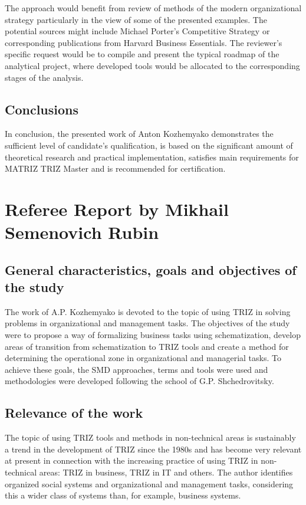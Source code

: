 \documentclass[11pt,a4paper]{article}
\begin{document}
The approach would benefit from review of methods of the modern organizational
strategy particularly in the view of some of the presented examples. The
potential sources might include Michael Porter’s Competitive Strategy or
corresponding publications from Harvard Business Essentials. The reviewer’s
specific request would be to compile and present the typical roadmap of the
analytical project, where developed tools would be allocated to the
corresponding stages of the analysis.

\subsection*{Conclusions}
In conclusion, the presented work of Anton Kozhemyako demonstrates the
sufficient level of candidate’s qualification, is based on the significant
amount of theoretical research and practical implementation, satisfies main
requirements for MATRIZ TRIZ Master and is recommended for certification.

\section{Referee Report by Mikhail Semenovich Rubin}

\subsection*{General characteristics, goals and objectives of the study}
The work of A.P. Kozhemyako is devoted to the topic of using TRIZ in solving
problems in organizational and management tasks. The objectives of the study
were to propose a way of formalizing business tasks using schematization,
develop areas of transition from schematization to TRIZ tools and create a
method for determining the operational zone in organizational and managerial
tasks.  To achieve these goals, the SMD approaches, terms and tools were used
and methodologies were developed following the school of G.P. Shchedrovitsky.

\subsection*{Relevance of the work}
The topic of using TRIZ tools and methods in non-technical areas is
sustainably a trend in the development of TRIZ since the 1980s and has become
very relevant at present in connection with the increasing practice of using
TRIZ in non-technical areas: TRIZ in business, TRIZ in IT and others.  The
author identifies organized social systems and organizational and management
tasks, considering this a wider class of systems than, for example, business
systems.
\end{document}
